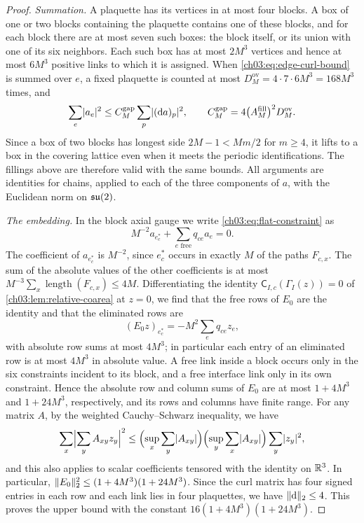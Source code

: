 \begin{proof}
\emph{Summation.} A plaquette has its vertices in at most four blocks. A box of one or two blocks containing the plaquette contains one of these blocks, and for each block there are at most seven such boxes: the block itself, or its union with one of its six neighbors. Each such box has at most $2M^3$ vertices and hence at most $6M^3$ positive links to which it is assigned. When \eqref{ch03:eq:edge-curl-bound} is summed over $e$, a fixed plaquette is counted at most $D_M^{\mathrm{ov}}=4\cdot7\cdot6M^3=168M^3$ times, and
\begin{equation}\label{ch03:eq:gap-constant}
 \sum_e\lvert a_e\rvert^2\le C_M^{\mathrm{gap}}\sum_p\lvert (\mathrm da)_p\rvert^2,\qquad C_M^{\mathrm{gap}}=4\bigl(A_M^{\mathrm{fill}}\bigr)^2D_M^{\mathrm{ov}}.
\end{equation}
Since a box of two blocks has longest side $2M-1<Mm/2$ for $m\ge4$, it lifts to a box in the covering lattice even when it meets the periodic identifications. The fillings above are therefore valid with the same bounds. All arguments are identities for chains, applied to each of the three components of $a$, with the Euclidean norm on $\mathfrak{su}(2)$.

\emph{The embedding.} In the block axial gauge we write \eqref{ch03:eq:flat-constraint} as
\[
 M^{-2}a_{e^*_c}+\sum_{e\text{ free}}q_{ce}a_e=0.
\]
The coefficient of $a_{e^*_c}$ is $M^{-2}$, since $e^*_c$ occurs in exactly $M$ of the paths $F_{c,x}$. The sum of the absolute values of the other coefficients is at most $M^{-3}\sum_x\operatorname{length}(F_{c,x})\le4M$. Differentiating the identity $\mathsf C_{I,c}(\Gamma_I(z))=0$ of \cref{ch03:lem:relative-coarea} at $z=0$, we find that the free rows of $E_0$ are the identity and that the eliminated rows are
\[
 (E_0z)_{e^*_c}=-M^2\sum_eq_{ce}z_e,
\]
with absolute row sums at most $4M^3$; in particular each entry of an eliminated row is at most $4M^3$ in absolute value. A free link inside a block occurs only in the six constraints incident to its block, and a free interface link only in its own constraint. Hence the absolute row and column sums of $E_0$ are at most $1+4M^3$ and $1+24M^3$, respectively, and its rows and columns have finite range. For any matrix $A$, by the weighted Cauchy--Schwarz inequality, we have
\[
 \sum_x\Bigl\lvert\sum_yA_{xy}z_y\Bigr\rvert^2\le\Bigl(\sup_x\sum_y\lvert A_{xy}\rvert\Bigr)\Bigl(\sup_y\sum_x\lvert A_{xy}\rvert\Bigr)\sum_y\lvert z_y\rvert^2,
\]
and this also applies to scalar coefficients tensored with the identity on $\mathbb R^3$. In particular, $\lVert E_0\rVert_2^2\le(1+4M^3)(1+24M^3)$. Since the curl matrix has four signed entries in each row and each link lies in four plaquettes, we have $\lVert \mathrm d\rVert_2\le4$. This proves the upper bound with the constant $16(1+4M^3)(1+24M^3)$.


\end{proof}
